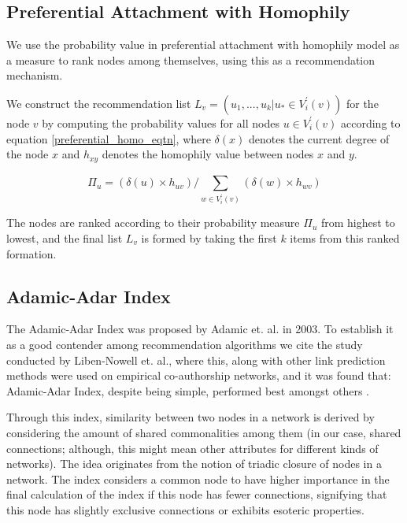 \subsection{Preferential Attachment with Homophily}
We use the probability value in preferential attachment with homophily model \cite{karimi2018homophily} as a measure to rank nodes among themselves, using this as a recommendation mechanism. 

We construct the recommendation list $L_{v}=(u_{1},...,u_{k} | u_{*} \in V^{\prime}_{i}(v))$ for the node $v$ by computing the probability values for all nodes $u \in V^{\prime}_{i}(v)$ according to equation \ref{preferential_homo_eqtn}, where $\delta(x)$ denotes the current degree of the node $x$ and $h_{xy}$ denotes the homophily value between nodes $x$ and $y$.

\begin{equation}
\label{preferential_homo_eqtn}
\Pi_{u} = (\delta(u) \times h_{uv}) / \sum_{w \in V^{\prime}_{i}(v)}^{} (\delta(w) \times h_{wv})
\end{equation}

The nodes are ranked according to their probability measure $\Pi_{u}$ from highest to lowest, and the final list $L_{v}$ is formed by taking the first $k$ items from this ranked formation.

\subsection{Adamic-Adar Index}
The Adamic-Adar Index \cite{adamic2003friends} was proposed by Adamic et. al. in 2003. To establish it as a good contender among recommendation algorithms we cite the study conducted by Liben-Nowell et. al., where this, along with other link prediction methods were used on empirical co-authorship networks, and it was found that: Adamic-Adar Index, despite being simple, performed best amongst others \cite{liben2007link}.

Through this index, similarity between two nodes in a network is derived by considering the amount of shared commonalities among them (in our case, shared connections; although, this might mean other attributes for different kinds of networks). The idea originates from the notion of triadic closure of nodes in a network. The index considers a common node to have higher importance in the final calculation of the index if this node has fewer connections, signifying that this node has slightly exclusive connections or exhibits esoteric properties.

